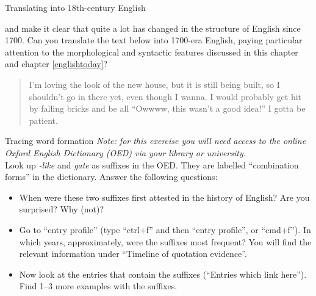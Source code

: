 \begin{exercises}{Translating into 18th-century English}\label{exercise-backtranslate}

 and  make it clear that quite a lot has changed in the structure of English since 1700. Can you translate the text below into 1700-era English, paying particular attention to the morphological and syntactic features discussed in this chapter and chapter \ref{englishtoday}?

\begin{quote}
    I'm loving the look of the new house, but it is still being built, so I shouldn't go in there yet, even though I wanna. I would probably get hit by falling bricks and be all ``Owwww, this wasn't a good idea!'' I gotta be patient.
\end{quote}

\end{exercises}

\begin{exercises}{Tracing word formation}\label{gate}
\emph{Note: for this exercise you will need access to the online Oxford English Dictionary (OED) via your library or university.}\\

\noindent Look up \textit{-like} and \textit{gate} as suffixes in the OED. They are labelled ``combination forms'' in the dictionary. Answer the following questions: 
\begin{itemize}
\item When were these two suffixes first attested in the history of English? Are you surprised? Why (not)?
\item Go to ``entry profile'' (type ``ctrl+f'' and then ``entry profile'', or ``cmd+f''). In which years, approximately, were the suffixes most frequent? You will find the relevant information under ``Timeline of quotation evidence''.
\item Now look at the entries that contain the suffixes (``Entries which link here''). Find 1--3 more examples with the suffixes.
\end{itemize}

\end{exercises}

